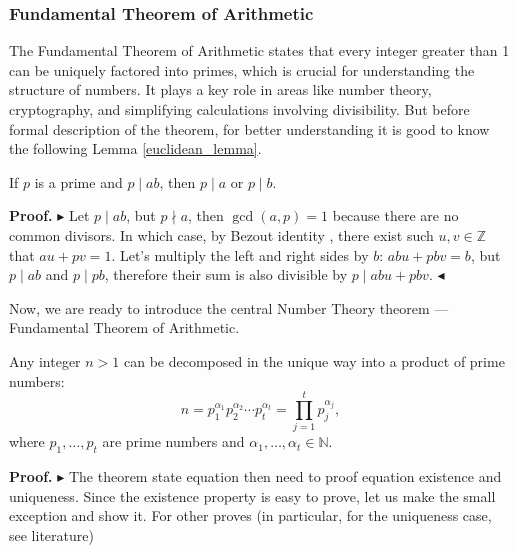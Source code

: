 \documentclass[../lecture-notes.tex]{subfiles}
\begin{document}
\subsubsection{Fundamental Theorem of Arithmetic}
The Fundamental Theorem of Arithmetic states that every integer greater than 1 can be uniquely factored into primes, which is crucial for understanding the structure of numbers. 
It plays a key role in areas like number theory, cryptography, and simplifying calculations involving divisibility. 
But before formal description of the theorem, for better understanding it is good to know the following Lemma \ref{euclidean_lemma}.

\begin{lemma}[Euclidean] \label{euclidean_lemma}
    If $p$ is a prime and $p \mid ab$, then $p \mid a$ or $p \mid b$.
\end{lemma}

\textbf{Proof.} 
$\blacktriangleright$
Let $p \mid ab$, but $ p \nmid a$, then $\gcd(a, p) = 1$ because there are no common divisors.
In which case, by Bezout identity , there exist such $u, v \in \mathbb{Z}$ that $au + pv = 1$.
Let's multiply the left and right sides by $b$: $abu + pbv = b$, but $p \mid ab$ and $p \mid pb$, therefore their sum is also divisible by $p \mid abu + pbv$. 
$\blacktriangleleft$

Now, we are ready to introduce the central Number Theory theorem --- Fundamental
Theorem of Arithmetic.

\begin{theorem}\label{th:fundamental_arithmetic}
    Any integer $n>1$ can be decomposed in the unique way into a product of prime numbers:
    \begin{equation*}
        n = p_1^{\alpha_1}p_2^{\alpha_2}\cdots p_t^{\alpha_t} = \prod_{j=1}^t p_j^{\alpha_j},
    \end{equation*}
    where $p_1,\dots,p_t$ are prime numbers and $\alpha_1,\dots,\alpha_t \in \mathbb{N}$.
\end{theorem}

\textbf{Proof.} 
$\blacktriangleright$  
The theorem state equation then need to proof equation existence and uniqueness. Since the existence property is 
easy to prove, let us make the small exception and show it. For other proves (in particular, for the uniqueness case, see literature)
\end{document}
